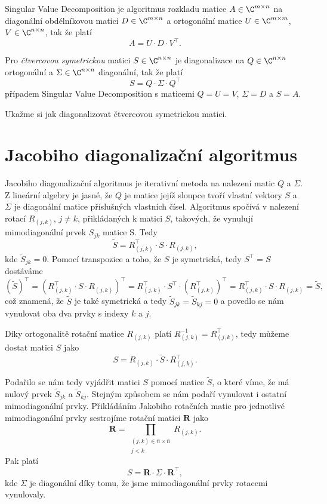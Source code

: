 \maketitle
Singular Value Decomposition je algoritmus rozkladu matice $A \in \C^{m \times n}$ na diagonální obdélníkovou matici $D \in \C^{m \times n}$ a ortogonální matice $U \in \C^{m\times m}$, $V \in \C^{n \times n}$, tak že platí
\[
	A = U\cdot D\cdot V^{\top}.
\]


Pro \emph{čtvercovou symetrickou} matici $S \in \C^{n \times n}$ je diagonalizace na $Q \in \C^{n \times n}$ ortogonální a $\Sigma \in \C^{n \times n}$ diagonální, tak že platí
\[
	S = Q\cdot \Sigma \cdot Q^{\top}
\]
případem Singular Value Decomposition s maticemi $Q = U = V$, $\Sigma = D$ a $S = A$.


Ukažme si jak diagonalizovat čtvercovou symetrickou matici.
\section{Jacobiho diagonalizační algoritmus}
Jacobiho diagonalizační algoritmus je iterativní metoda na nalezení matic $Q$ a $\Sigma$. Z lineární algebry je jasné, že $Q$ je matice jejíž sloupce tvoří vlastní vektory $S$ a $\Sigma$ je diagonální matice příslušných vlastních čísel. Algoritmus spočívá v nalezení rotací $R_{(j,k)}$, $j \neq k$, přikládaných k matici $S$, takových, že vynulují mimodiagonální prvek $S_{jk}$ matice S. Tedy
\begin{equation}
	\label{eq:tvar_iterace_prvku_sjk}
	\tilde{S} = R_{(j,k)}^{\top}\cdot S \cdot R_{(j,k)},
\end{equation}
kde $ \tilde{S}_{jk} = 0$. Pomocí transpozice a toho, že $S$ je symetrická, tedy $S^{\top}= S$ dostáváme
\[
	\left(  \tilde{S} \right)^{\top} =
	\left( R_{(j,k)}^{\top}\cdot S \cdot R_{(j,k)} \right)^{\top} =
	R_{(j,k)}^{\top}\cdot S^{\top} \cdot \left(R_{(j,k)}^{\top}\right)^{\top} =
	R_{(j,k)}^{\top} \cdot S \cdot R_{(j,k)} = \tilde{S},
\]
což znamená, že $\tilde{S}$ je také symetrická a tedy $\tilde{S}_{jk} = \tilde{S}_{kj} = 0$ a povedlo se nám vynulovat oba dva prvky s indexy $k$ a $j$.


Díky ortogonalitě rotační matice $R_{(j,k)}$ platí $R_{(j,k)}^{-1} = R_{(j,k)}^{\top}$, tedy můžeme dostat matici $S$ jako
\[
	S = R_{(j,k)}\cdot\tilde{S}\cdot R_{(j,k)}^{\top}.
\]


Podařilo se nám tedy vyjádřit matici $S$ pomocí matice $\tilde{S}$, o které víme, že má nulový prvek $\tilde{S}_{jk}$ a $\tilde{S}_{kj}$. Stejným způsobem se nám podaří vynulovat i ostatní mimodiagonální prvky. Přikládáním Jakobiho rotačních matic pro jednotlivé mimodiagonální prvky sestrojíme rotační matici $\boldsymbol{R}$ jako
\[
	\boldsymbol{R} = \prod_{
		\substack{ (j,k) \in \hat{n} \times \hat{n} \\ j < k}
	}   R_{(j,k)}.
\]
Pak platí
\[
	S = \boldsymbol{R}\cdot \Sigma \cdot \boldsymbol{R}^{\top},
\]
kde $\Sigma$ je diagonální díky tomu, že jsme mimodiagonální prvky rotacemi vynulovaly.

